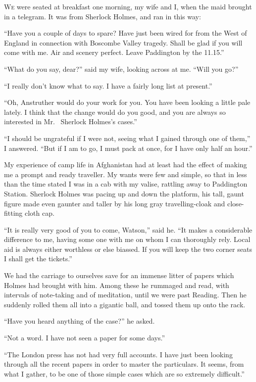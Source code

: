 
\textsc{We} were seated at breakfast one morning, my wife
and I, when the maid brought in a telegram. It
was from Sherlock Holmes, and ran in this way:

“Have you a couple of days to spare? Have
just been wired for from the West of England in connection
with Bos\-combe Valley tragedy. Shall be glad if you will
come with me. Air and scenery perfect. Leave Paddington
by the 11.15.”

“What do you say, dear?” said my wife, looking across at
me. “Will you go?”

“I really don’t know what to say. I have a fairly long list
at present.”

“Oh, Anstruther would do your work for you. You have
been looking a little pale lately. I think that the change
would do you good, and you are always so interested in Mr.\ %
Sherlock Holmes’s cases.”

“I should be ungrateful if I were not, seeing what I gained
through one of them,” I answered. “But if I am to go, I
must pack at once, for I have only half an hour.”

My experience of camp life in Afghanistan had at least had
the effect of making me a prompt and ready traveller. My
wants were few and simple, so that in less than the time
stated I was in a cab with my valise, rattling away to Paddington
Station. Sherlock Holmes was pacing up and down
the platform, his tall, gaunt figure made even gaunter and
taller by his long gray travelling-cloak and close-fitting cloth
cap.

“It is really very good of you to come, Watson,” said he.
“It makes a considerable difference to me, having some one
with me on whom I can thoroughly rely. Local aid is always
either worthless or else biassed. If you will keep the two
corner seats I shall get the tickets.”

We had the carriage to ourselves save for an immense litter
of papers which Holmes had brought with him. Among
these he rummaged and read, with intervals of note-taking
and of meditation, until we were past Reading. Then he
suddenly rolled them all into a gigantic ball, and tossed them
up onto the rack.

“Have you heard anything of the case?” he asked.

“Not a word. I have not seen a paper for some days.”

“The London press has not had very full accounts. I
have just been looking through all the recent papers in order
to master the particulars. It seems, from what I gather,
to be one of those simple cases which are so extremely
difficult.”

